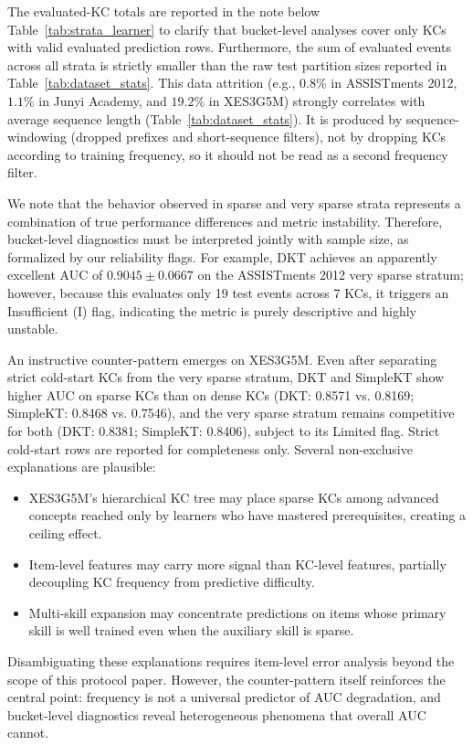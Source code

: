 

The evaluated-KC totals are reported in the note below Table~\ref{tab:strata_learner} to clarify that bucket-level analyses cover only KCs with valid evaluated prediction rows. Furthermore, the sum of evaluated events across all strata is strictly smaller than the raw test partition sizes reported in Table~\ref{tab:dataset_stats}. This data attrition (e.g., $0.8\%$ in ASSISTments 2012, $1.1\%$ in Junyi Academy, and $19.2\%$ in XES3G5M) strongly correlates with average sequence length (Table~\ref{tab:dataset_stats}). It is produced by sequence-windowing (dropped prefixes and short-sequence filters), not by dropping KCs according to training frequency, so it should not be read as a second frequency filter.

We note that the behavior observed in sparse and very sparse strata represents a combination of true performance differences and metric instability. Therefore, bucket-level diagnostics must be interpreted jointly with sample size, as formalized by our reliability flags. For example, DKT achieves an apparently excellent AUC of $0.9045 \pm 0.0667$ on the ASSISTments 2012 very sparse stratum; however, because this evaluates only 19 test events across 7 KCs, it triggers an Insufficient (I) flag, indicating the metric is purely descriptive and highly unstable.

An instructive counter-pattern emerges on XES3G5M. Even after separating strict cold-start KCs from the very sparse stratum, DKT and SimpleKT show higher AUC on sparse KCs than on dense KCs (DKT: 0.8571 vs. 0.8169; SimpleKT: 0.8468 vs. 0.7546), and the very sparse stratum remains competitive for both (DKT: 0.8381; SimpleKT: 0.8406), subject to its Limited flag. Strict cold-start rows are reported for completeness only. Several non-exclusive explanations are plausible:
\begin{itemize}
    \item XES3G5M's hierarchical KC tree may place sparse KCs among advanced concepts reached only by learners who have mastered prerequisites, creating a ceiling effect.
    \item Item-level features may carry more signal than KC-level features, partially decoupling KC frequency from predictive difficulty.
    \item Multi-skill expansion may concentrate predictions on items whose primary skill is well trained even when the auxiliary skill is sparse.
\end{itemize}
Disambiguating these explanations requires item-level error analysis beyond the scope of this protocol paper. However, the counter-pattern itself reinforces the central point: frequency is not a universal predictor of AUC degradation, and bucket-level diagnostics reveal heterogeneous phenomena that overall AUC cannot.

